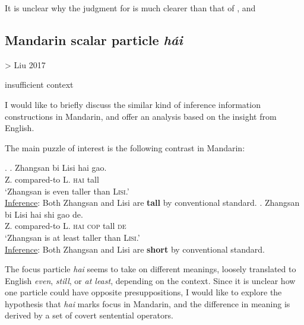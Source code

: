 \documentclass[12pt,letterpaper]{scrartcl}
\begin{document}
It is unclear why the judgment for \Last[a] is much clearer than that of \Last[b], and 

\subsection{Mandarin scalar particle \textit{h\'{a}i}} 


\newpage


> Liu 2017

insufficient context

I would like to briefly discuss the similar kind of inference information constructions in Mandarin, and offer an analysis based on the insight from English.

The main puzzle of interest is the following contrast in Mandarin:

\ex. \label{main}  \ag.  Zhangsan bi Lisi hai gao. \\
		Z. compared-to L. \textsc{hai} tall \\
		`Zhangsan is even taller than \textsc{Lisi}.' \\
		\underline{Inference}: Both Zhangsan and Lisi are \textbf{tall} by conventional standard.  \label{main-hai}
\bg. Zhangsan bi Lisi hai shi gao de. \\
		Z. compared-to L. \textsc{hai} \textsc{cop} tall \textsc{de} \\
		`Zhangsan is at least taller than \textsc{Lisi}.' \\
		\underline{Inference}: Both Zhangsan and Lisi are \textbf{short} by conventional standard.  \label{main-haishide}
		
The focus particle \textit{hai} seems to take on different meanings, loosely translated to English \textit{even}, \textit{still}, or \textit{at least}, depending on the context. Since it is unclear how one particle could have opposite presuppositions, I would like to explore the hypothesis that \textit{hai} marks focus in Mandarin, and the difference in meaning is derived by a set of covert sentential operators.
\end{document}

